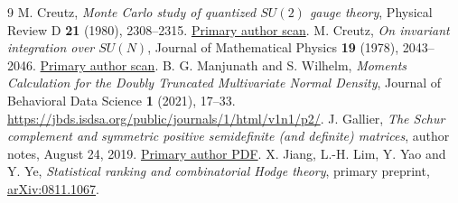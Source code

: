 \documentclass[11pt]{article}
\begin{document}
\clearpage
\begin{thebibliography}{9}\small
{} M. Creutz, \emph{Monte Carlo study of quantized
$SU(2)$ gauge theory}, Physical Review D \textbf{21} (1980), 2308--2315.
\href{https://www.latticeguy.net/mypubs/pub037.pdf}{Primary author scan}.
 M. Creutz, \emph{On invariant integration over $SU(N)$},
Journal of Mathematical Physics \textbf{19} (1978), 2043--2046.
\href{https://www.latticeguy.net/mypubs/pub028.pdf}{Primary author scan}.
 B. G. Manjunath and S. Wilhelm,
\emph{Moments Calculation for the Doubly Truncated Multivariate Normal Density},
Journal of Behavioral Data Science \textbf{1} (2021), 17--33.
\url{https://jbds.isdsa.org/public/journals/1/html/v1n1/p2/}.
 J. Gallier, \emph{The Schur complement and symmetric positive
semidefinite (and definite) matrices}, author notes, August 24, 2019.
\href{https://www.cis.upenn.edu/~jean/schur-comp.pdf}{Primary author PDF}.
 X. Jiang, L.-H. Lim, Y. Yao and Y. Ye,
\emph{Statistical ranking and combinatorial Hodge theory}, primary preprint,
\href{https://arxiv.org/abs/0811.1067}{arXiv:0811.1067}.
\end{thebibliography}
\end{document}
